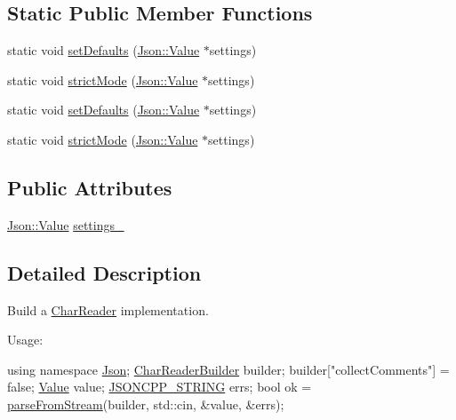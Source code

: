 \subsection*{Static Public Member Functions}
\begin{DoxyCompactItemize}
\item 
static void \hyperlink{class_json_1_1_char_reader_builder_a03ff031e06aabff989ab4addc87294ab}{set\+Defaults} (\hyperlink{class_json_1_1_value}{Json\+::\+Value} $\ast$settings)
\item 
static void \hyperlink{class_json_1_1_char_reader_builder_a9c19e3c5475f9072d527810d4bf56749}{strict\+Mode} (\hyperlink{class_json_1_1_value}{Json\+::\+Value} $\ast$settings)
\item 
static void \hyperlink{class_json_1_1_char_reader_builder_a0ddbea7a0af6da9feea922fbe4e5d6c6}{set\+Defaults} (\hyperlink{class_json_1_1_value}{Json\+::\+Value} $\ast$settings)
\item 
static void \hyperlink{class_json_1_1_char_reader_builder_a62a6e55ae25c756994ee273f7d16044a}{strict\+Mode} (\hyperlink{class_json_1_1_value}{Json\+::\+Value} $\ast$settings)
\end{DoxyCompactItemize}
\subsection*{Public Attributes}
\begin{DoxyCompactItemize}
\item 
\hyperlink{class_json_1_1_value}{Json\+::\+Value} \hyperlink{class_json_1_1_char_reader_builder_ac69b7911ad64c171c51ebaf2ea26d958}{settings\+\_\+}
\end{DoxyCompactItemize}


\subsection{Detailed Description}
Build a \hyperlink{class_json_1_1_char_reader}{Char\+Reader} implementation. 

Usage\+: 
\begin{DoxyCode}
\textcolor{keyword}{using namespace }\hyperlink{namespace_json}{Json};
\hyperlink{class_json_1_1_char_reader_builder}{CharReaderBuilder} builder;
builder[\textcolor{stringliteral}{"collectComments"}] = \textcolor{keyword}{false};
\hyperlink{class_json_1_1_value}{Value} value;
\hyperlink{json-forwards_8h_a1e723f95759de062585bc4a8fd3fa4be}{JSONCPP\_STRING} errs;
\textcolor{keywordtype}{bool} ok = \hyperlink{namespace_json_aab0cf1ecf81d1aeca12be2a416a84352}{parseFromStream}(builder, std::cin, &value, &errs);
\end{DoxyCode}
 


